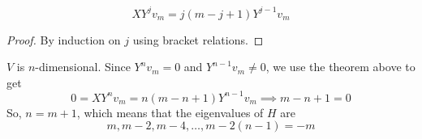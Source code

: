  \begin{theorem}
    \begin{equation}
      X Y^j v_m = j(m-j+1) Y^{j-1} v_m
    \end{equation}
  \end{theorem}
  \begin{proof}
    By induction on $j$ using bracket relations.
  \end{proof}

  $V$ is $n$-dimensional. Since $Y^n v_m = 0$ and $Y^{n-1} v_m \neq 0$, we use the theorem above to get
  \begin{equation}
    0 = X Y^n v_m = n (m-n+1) Y^{n-1} v_m \implies m-n+1=0
  \end{equation}
  So, $n = m+1$, which means that the eigenvalues of $H$ are
  \begin{equation}
    m, m-2, m-4, \ldots, m - 2(n-1) = -m
  \end{equation}

